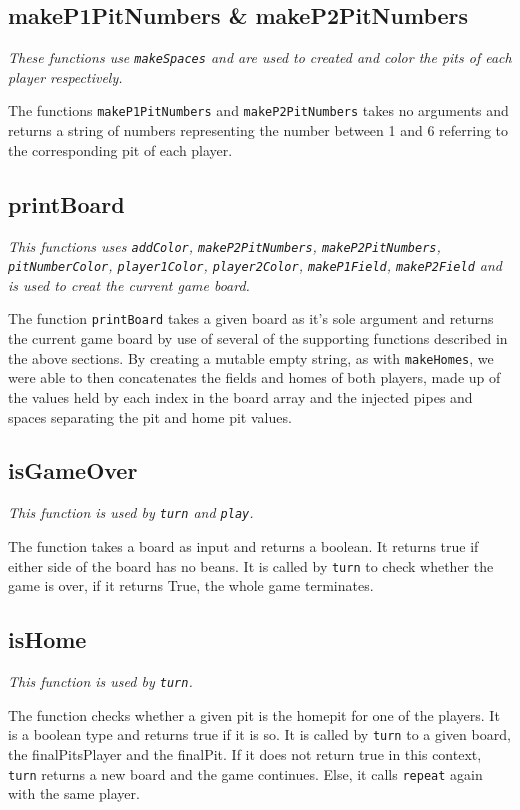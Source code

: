 \documentclass[a4paper]{report}
\begin{document}
\subsection*{makeP1PitNumbers \& makeP2PitNumbers}
{\it These functions use \texttt{makeSpaces} and are used to created and color the pits of each player respectively.}


The functions \texttt{makeP1PitNumbers} and \texttt{makeP2PitNumbers} takes no arguments and returns a string of numbers representing the number between 1 and 6 referring to the corresponding pit of each player. 

\subsection*{printBoard}
{\it This functions uses \texttt{addColor}, \texttt{makeP2PitNumbers}, \texttt{makeP2PitNumbers}, \texttt{pitNumberColor}, \texttt{player1Color}, \texttt{player2Color}, \texttt{makeP1Field}, \texttt{makeP2Field} and is used to creat the current game board.}

The function \texttt{printBoard} takes a given board as it's sole argument and returns the current game board by use of several of the supporting functions described in the above sections. By creating a mutable empty string, as with \texttt{makeHomes}, we were able to then concatenates the fields and homes of both players, made up of the values held by each index in the board array and the injected pipes and spaces separating the pit and home pit values.

\subsection*{isGameOver}
{\it This function is used by \texttt{turn} and \texttt{play}.}

The function takes a board as input and returns a boolean. It returns true if either side of the board has no beans. It is called by \texttt{turn} to check whether the game is over, if it returns True, the whole game terminates.

\subsection*{isHome}
{\it This function is used by \texttt{turn}.}

The function checks whether a given pit is the homepit for one of the players. It is a boolean type and returns true if it is so.
It is called by \texttt{turn} to a given board, the finalPitsPlayer and the finalPit. If it does not return true in this context, \texttt{turn} returns a new board and the game continues. Else, it calls \texttt{repeat} again with the same player.
\end{document}
